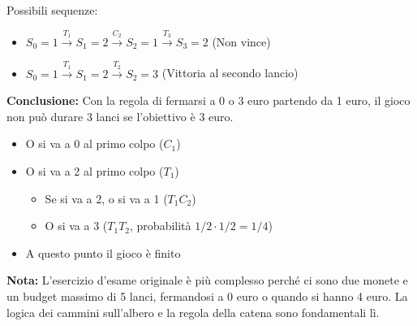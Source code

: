 \begin{exercise}
Possibili sequenze:
\begin{itemize}
    \item $S_0=1 \xrightarrow{T_1} S_1=2 \xrightarrow{C_2} S_2=1 \xrightarrow{T_3} S_3=2$ (Non vince)
    \item $S_0=1 \xrightarrow{T_1} S_1=2 \xrightarrow{T_2} S_2=3$ (Vittoria al secondo lancio)
\end{itemize}

\textbf{Conclusione:} Con la regola di fermarsi a 0 o 3 euro partendo da 1 euro, il gioco non può durare 3 lanci se l'obiettivo è 3 euro. 
\begin{itemize}
    \item O si va a 0 al primo colpo ($C_1$)
    \item O si va a 2 al primo colpo ($T_1$)
        \begin{itemize}
            \item Se si va a 2, o si va a 1 ($T_1 C_2$)
            \item O si va a 3 ($T_1 T_2$, probabilità $1/2 \cdot 1/2 = 1/4$)
        \end{itemize}
    \item A questo punto il gioco è finito
\end{itemize}

\textbf{Nota:} L'esercizio d'esame originale è più complesso perché ci sono due monete e un budget massimo di 5 lanci, fermandosi a 0 euro o quando si hanno 4 euro. La logica dei cammini sull'albero e la regola della catena sono fondamentali lì.
\end{exercise}


